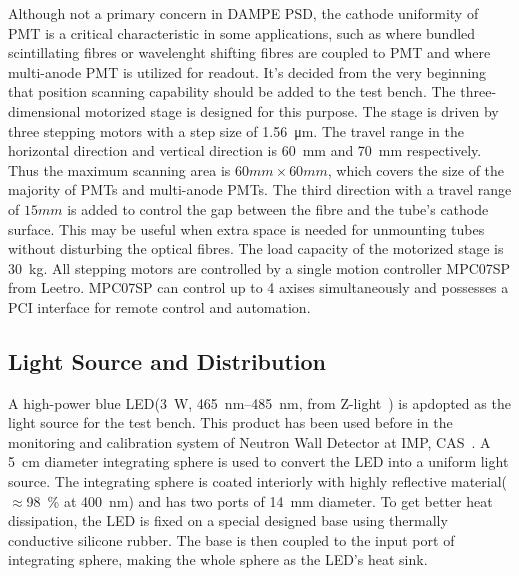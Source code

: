 \documentclass[5p, times]{elsarticle}
\begin{document}
Although not a primary concern in DAMPE PSD, the cathode uniformity of PMT is a critical characteristic in some applications, such as where bundled scintillating fibres or wavelenght shifting fibres are coupled to PMT and where multi-anode PMT is utilized for readout.
It's decided from the very beginning that position scanning capability should be added to the test bench.
The three-dimensional motorized stage is designed for this purpose.
The stage is driven by three stepping motors with a step size of \SI{1.56}{\micro\meter}.
The travel range in the horizontal direction and vertical direction is \SI{60}{\milli\meter} and \SI{70}{\milli\meter} respectively.
Thus the maximum scanning area is $60mm\times60mm$, which covers the size of the majority of PMTs and multi-anode PMTs.
The third direction with a travel range of $15mm$ is added to control the gap between the fibre and the tube's cathode surface.
This may be useful when extra space is needed for unmounting tubes without disturbing the optical fibres. 
The load capacity of the motorized stage is \SI{30}{\kilo\gram}.
All stepping motors are controlled by a single motion controller MPC07SP from Leetro.
MPC07SP can control up to 4 axises simultaneously and possesses a PCI interface for remote control and automation.

\subsection{Light Source and Distribution}
\label{sec:light_source}

A high-power blue LED(\SI{3}{\watt}, \SIrange{465}{485}{\nano\meter},  from Z-light~\cite{zlight}) is apdopted as the light source for the test bench.
This product has been used before in the monitoring and calibration system of Neutron Wall Detector at IMP, CAS~\cite{yuyuhong_led}. 
A \SI{5}{\centi\meter} diameter integrating sphere is used to convert the LED into a uniform light source.
The integrating sphere is coated interiorly with highly reflective material($\approx$\SI{98}{\percent} at \SI{400}{\nano\meter}) and has two ports of \SI{14}{\milli\meter} diameter.
To get better heat dissipation, the LED is fixed on a special designed base using thermally conductive silicone rubber.
The base is then coupled to the input port of integrating sphere, making the whole sphere as the LED's heat sink.
\end{document}
